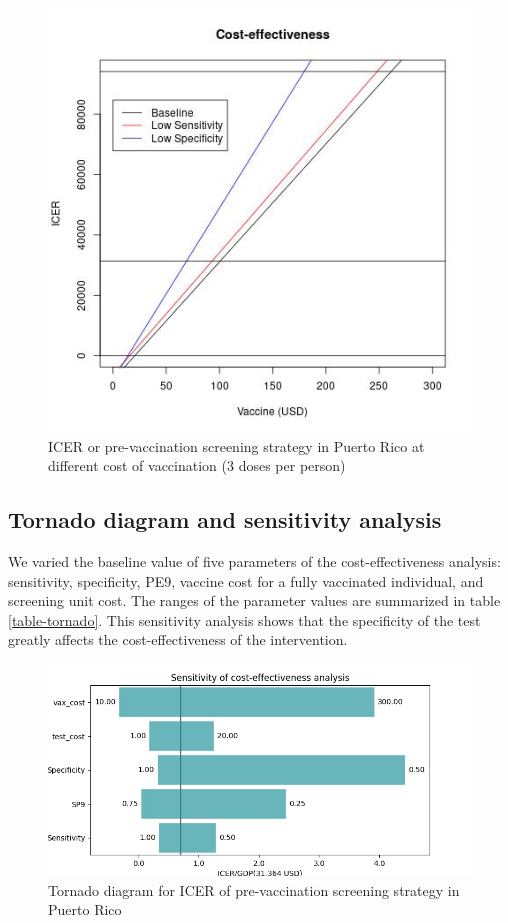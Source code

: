 \documentclass[11pt]{article}
\begin{document}
\begin{figure}[htbp]
\centering
\includegraphics[width=.9\linewidth]{../analysis/figures/report_figure_ICER.jpeg}
\caption{\label{fig-ICER}
ICER or pre-vaccination screening strategy in Puerto Rico at different cost of vaccination (3 doses per person)}
\end{figure}

\subsection{Tornado diagram and sensitivity analysis}
\label{sec:org3b84392}
We varied the baseline value of five parameters of the cost-effectiveness analysis: sensitivity, specificity, PE9, vaccine cost for a fully vaccinated individual, and screening unit cost. The ranges of the parameter values are summarized in table \ref{table-tornado}. This sensitivity analysis shows that the specificity of the test greatly affects the cost-effectiveness of the intervention. 

\begin{figure}[htbp]
\centering
\includegraphics[width=.9\linewidth]{../analysis/figures/report_figure_tornado_diagram.jpeg}
\caption{\label{fig-tornado}
Tornado diagram for ICER of pre-vaccination screening strategy in Puerto Rico}
\end{figure}
\end{document}

